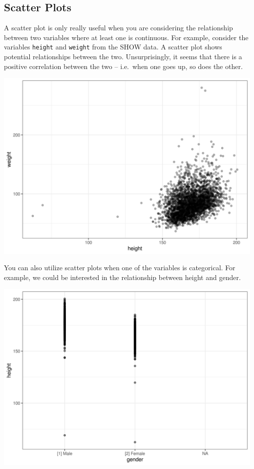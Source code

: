 \documentclass[]{book}
\theoremstyle{definition}
\theoremstyle{definition}
\theoremstyle{definition}
\theoremstyle{remark}
\begin{document}
\hypertarget{scatter-plots}{%
\subsection{Scatter Plots}\label{scatter-plots}}

A scatter plot is only really useful when you are considering the relationship between two variables where at least one is continuous. For example, consider the variables \texttt{height} and \texttt{weight} from the SHOW data. A scatter plot shows potential relationships between the two. Unsurprisingly, it seems that there is a positive correlation between the two -- i.e.~when one goes up, so does the other.

\includegraphics{figures/scatter_height_weight.png}

You can also utilize scatter plots when one of the variables is categorical. For example, we could be interested in the relationship between height and gender.

\includegraphics{figures/scatter_gender_height.png}
\end{document}
